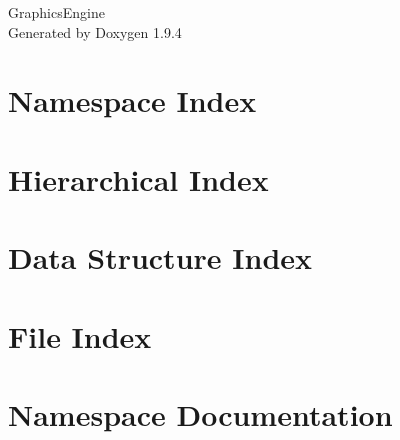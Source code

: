\documentclass[twoside]{book}
\newcommand{\+}{\discretionary{\mbox{\scriptsize$\hookleftarrow$}}{}{}}
\newcommand{\clearemptydoublepage}{%
    \newpage{\pagestyle{empty}\cleardoublepage}%
  }
\begin{document}
  \raggedbottom
    \hypersetup{pageanchor=false,
                bookmarksnumbered=true,
                pdfencoding=unicode
               }
  \begin{titlepage}
  \vspace*{7cm}
  \begin{center}%
  {\Large Graphics\+Engine}\\
  \vspace*{1cm}
  {\large Generated by Doxygen 1.9.4}\\
  \end{center}
  \end{titlepage}
  \clearemptydoublepage
  \tableofcontents
  \clearemptydoublepage
  \hypersetup{pageanchor=true}
\chapter{Namespace Index}

\chapter{Hierarchical Index}

\chapter{Data Structure Index}

\chapter{File Index}

\chapter{Namespace Documentation}

\end{document}
